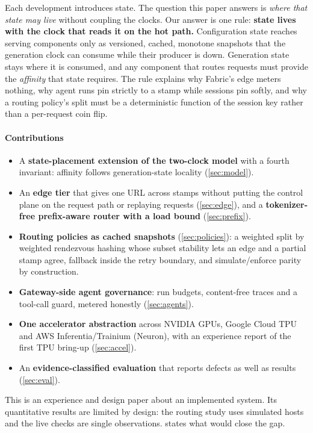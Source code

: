 \documentclass[conference,letterpaper]{IEEEtran}
\newcommand{\sys}{Fabric}
\begin{document}
Each development introduces state. The question this paper answers is \emph{where that
state may live} without coupling the clocks. Our answer is one rule: \textbf{state lives
with the clock that reads it on the hot path.} Configuration state reaches serving
components only as versioned, cached, monotone snapshots that the generation clock can
consume while their producer is down. Generation state stays where it is consumed, and any
component that routes requests must provide the \emph{affinity} that state requires. The
rule explains why \sys{}'s edge meters nothing, why agent runs pin strictly to a stamp while
sessions pin softly, and why a routing policy's split must be a deterministic function of the
session key rather than a per-request coin flip.

\paragraph*{Contributions}
\begin{itemize}
  \item A \textbf{state-placement extension of the two-clock model} with a fourth invariant:
  affinity follows generation-state locality (\cref{sec:model}).
  \item An \textbf{edge tier} that gives one URL across stamps without putting the control
  plane on the request path or replaying requests (\cref{sec:edge}), and a
  \textbf{tokenizer-free prefix-aware router with a load bound} (\cref{sec:prefix}).
  \item \textbf{Routing policies as cached snapshots} (\cref{sec:policies}): a weighted split
  by weighted rendezvous hashing whose subset stability lets an edge and a partial stamp agree,
  fallback inside the retry boundary, and simulate/enforce parity by construction.
  \item \textbf{Gateway-side agent governance}: run budgets, content-free traces and a
  tool-call guard, metered honestly (\cref{sec:agents}).
  \item \textbf{One accelerator abstraction} across NVIDIA GPUs, Google Cloud TPU and AWS
  Inferentia/Trainium (Neuron), with an experience report of the first TPU bring-up
  (\cref{sec:accel}).
  \item An \textbf{evidence-classified evaluation} that reports defects as well as results
  (\cref{sec:eval}).
\end{itemize}

This is an experience and design paper about an implemented system. Its quantitative results
are limited by design: the routing study uses simulated hosts and the live checks are single
observations.  states what would close the gap.
\end{document}
